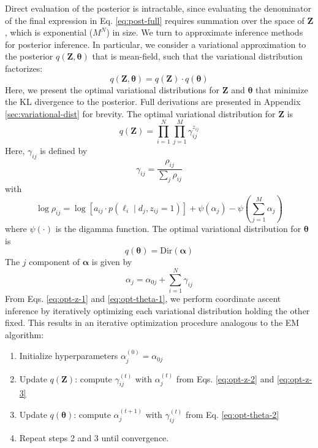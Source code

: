 Direct evaluation of the posterior is intractable, since evaluating the denominator of the final expression in Eq. \ref{eq:post-full} requires summation over the space of $\bm{Z}$, which is exponential ($M^N$) in size. We turn to approximate inference methods for posterior inference. In particular, we consider a variational approximation to the posterior $q(\bm{Z},\bm{\theta})$ that is mean-field, such that the variational distribution factorizes:
\begin{equation}
    q(\bm{Z},\bm{\theta})=q(\bm{Z})\cdot q(\bm\theta)
\end{equation}
Here, we present the optimal variational distributions for $\bm{Z}$ and $\bm\theta$ that minimize the KL divergence to the posterior. Full derivations are presented in Appendix \ref{sec:variational-dist} for brevity. The optimal variational distribution for $\bm{Z}$ is
\begin{equation}\label{eq:opt-z-1}
    q(\bm{Z})=\prod_{i=1}^N\prod_{j=1}^M \gamma_{ij}^{z_{ij}}
\end{equation}
Here, $\gamma_{ij}$ is defined by 
\begin{equation}\label{eq:opt-z-2}
    \gamma_{ij}=\frac{\rho_{ij}}{\sum_j\rho_{ij}}
\end{equation}
with
\begin{equation}\label{eq:opt-z-3}
    \log\rho_{ij}=\log\left[a_{ij}\cdot p(\ell_i\mid d_j,z_{ij}=1)\right]+\psi(\alpha_j)-\psi\left(\sum_{j=1}^M\alpha_j\right)
\end{equation}
where $\psi(\cdot)$ is the digamma function. 
The optimal variational distribution for $\bm\theta$ is
\begin{equation}\label{eq:opt-theta-1}
    q(\bm\theta) = \mathrm{Dir}(\bm\alpha)
\end{equation}
The $j$ component of $\bm\alpha$ is given by
\begin{equation}\label{eq:opt-theta-2}
    \alpha_j=\alpha_{0j}+\sum_{i=1}^N\gamma_{ij}
\end{equation}
From Eqs. \ref{eq:opt-z-1} and \ref{eq:opt-theta-1}, we perform coordinate ascent inference by iteratively optimizing each variational distribution holding the other fixed. This results in an iterative optimization procedure analogous to the EM algorithm:
\begin{enumerate}
    \item Initialize hyperparameters $\alpha_j^{(0)}=\alpha_{0j}$
    \item Update $q(\bm{Z})$: compute $\gamma_{ij}^{(t)}$  with $\alpha_j^{(t)}$ from Eqs. \ref{eq:opt-z-2} and \ref{eq:opt-z-3}
    \item Update $q(\bm\theta)$: compute $\alpha_{j}^{(t+1)}$  with $\gamma_{ij}^{(t)}$ from Eq. \ref{eq:opt-theta-2}
    \item Repeat steps 2 and 3 until convergence. 
\end{enumerate}

